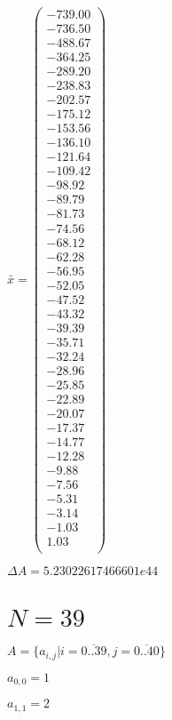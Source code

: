 \documentclass[a4paper,12pt]{article}
\begin{document}
$\bar { x } = \begin{pmatrix}
-739.00 \\
-736.50 \\
-488.67 \\
-364.25 \\
-289.20 \\
-238.83 \\
-202.57 \\
-175.12 \\
-153.56 \\
-136.10 \\
-121.64 \\
-109.42 \\
-98.92 \\
-89.79 \\
-81.73 \\
-74.56 \\
-68.12 \\
-62.28 \\
-56.95 \\
-52.05 \\
-47.52 \\
-43.32 \\
-39.39 \\
-35.71 \\
-32.24 \\
-28.96 \\
-25.85 \\
-22.89 \\
-20.07 \\
-17.37 \\
-14.77 \\
-12.28 \\
-9.88 \\
-7.56 \\
-5.31 \\
-3.14 \\
-1.03 \\
1.03 \\
\end{pmatrix}
$

$\Delta A = 5.23022617466601e44$



\section{ $N = 39$ }
$A = \{ a _{ i, j } | i = \overline { 0..39 }, j = \overline { 0..40 } \}$

$a _{ 0, 0 } = 1$

$a _{ 1, 1 } = 2$
\end{document}
